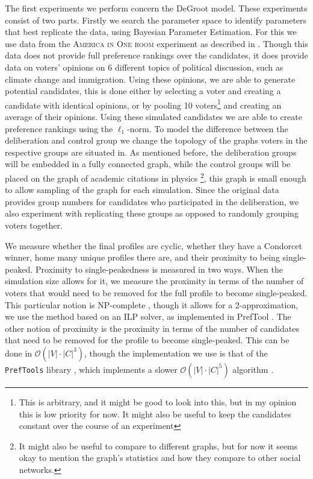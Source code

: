 The first experiments we perform concern the DeGroot model. These experiments
consist of two parts. Firstly we search the parameter space to identify
parameters that best replicate the data, using Bayesian Parameter Estimation.
For this we use data from the \textsc{America in One room} experiment as
described in . Though this data does not provide
full preference rankings over the candidates, it does provide data on voters'
opinions on 6 different topics of political discussion, such as climate change
and immigration. Using these opinions, we are able to generate potential
candidates, this is done either by selecting a voter and creating a candidate
with identical opinions, or by pooling 10 voters\footnote{This is arbitrary,
	and it might be good to look into this, but in my opinion this is low priority
	for now. It might also be useful to keep the candidates constant over the
	course of an experiment}
and creating an average of their opinions. Using these
simulated candidates we are able to create preference rankings using the
$\ell_1$-norm. To model the difference between the deliberation and control
group we change the topology of the graphs voters in the respective groups are
situated in. As mentioned before, the deliberation groups will be embedded in a fully connected
graph, while the control groups will be placed on the graph of academic
citations in physics \cite{nr}\footnote{It might also be useful to compare to
different graphs, but for now it seems okay to mention the graph's statistics
and how they compare to other social networks.}, this graph is small enough to
allow sampling of the graph for each simulation. Since the original data
provides group numbers for candidates who participated in the deliberation, we
also experiment with replicating these groups as opposed to randomly grouping
voters together.


We measure whether the final profiles are cyclic, whether they have a Condorcet
winner, home many unique profiles there are, and their proximity to being
single-peaked. Proximity to single-peakedness is measured in two ways. When the
simulation size allows for it, we measure the proximity in terms of the number
of voters that would need to be removed for the full profile to become
single-peaked. This particular notion is NP-complete
\cite{erdelyiComputationalAspectsNearly2013}, though it allows for a
2-approximation, we use the method based on an ILP solver, as implemented in
PrefTool \cite{PrefLibPreflibtools2025}. The other notion of proximity is the proximity in
terms of the number of candidates that need to be removed for the profile to
become single-peaked. This can be done in $\mathcal{O}(|V| \cdot{} |C|
^3)$\cite{przedmojskiAlgorithmsExperimentsNearly}, though the implementation we
use is that of the \texttt{PrefTools} library \cite{PrefLibPreflibtools2025}, which implements
a slower $\mathcal{O}(|V| \cdot{} |C|^5)$ algorithm
\cite{erdelyiComputationalAspectsNearly2013}. 




